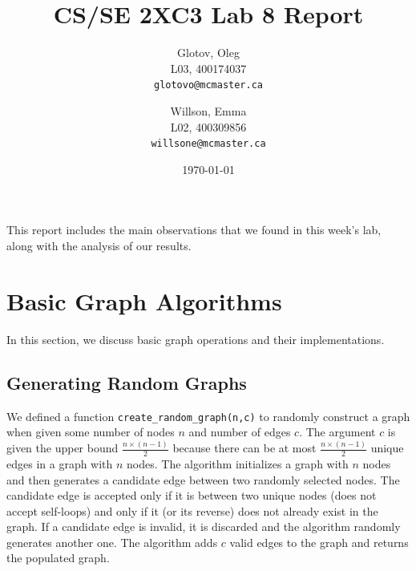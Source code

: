 \documentclass[12pt]{article}
\title{CS/SE 2XC3 Lab 8 Report}
\author{
  Glotov, Oleg\\ L03, 400174037\\
  \texttt{glotovo@mcmaster.ca}
  \and
  Willson, Emma\\ L02, 400309856\\
  \texttt{willsone@mcmaster.ca}
  }
\date{\today}
\begin{document}
\maketitle

This report includes the main observations that we found in this week's lab, along with the analysis of our results.

\newpage 
\section{Basic Graph Algorithms}
In this section, we discuss basic graph operations and their implementations. 
\subsection{Generating Random Graphs}
We defined a function \verb+create_random_graph(n,c)+ to randomly construct a graph when given some number of nodes $n$ and number of edges $c$. The argument $c$ is given the upper bound $\frac{n\times(n-1)}{2}$ because there can be at most $\frac{n\times(n-1)}{2}$ unique edges in a graph with $n$ nodes. The algorithm initializes a graph with $n$ nodes and then generates a candidate edge between two randomly selected nodes. The candidate edge is accepted only if it is between two unique nodes (does not accept self-loops) and only if it (or its reverse) does not already exist in the graph. If a candidate edge is invalid, it is discarded and the algorithm randomly generates another one. The algorithm adds $c$ valid edges to the graph and returns the populated graph.
\end{document}
